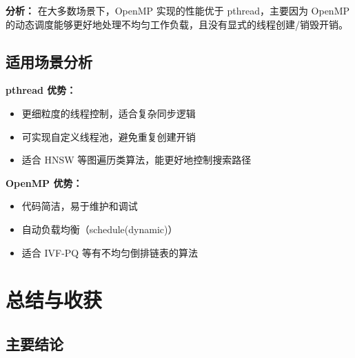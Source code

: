 \documentclass[a4paper]{article}
\begin{document}
\textbf{分析：} 在大多数场景下，OpenMP 实现的性能优于 pthread，主要因为 OpenMP 的动态调度能够更好地处理不均匀工作负载，且没有显式的线程创建/销毁开销。

\subsection{适用场景分析}

\textbf{pthread 优势：}
\begin{itemize}
\item 更细粒度的线程控制，适合复杂同步逻辑
\item 可实现自定义线程池，避免重复创建开销
\item 适合 HNSW 等图遍历类算法，能更好地控制搜索路径
\end{itemize}

\textbf{OpenMP 优势：}
\begin{itemize}
\item 代码简洁，易于维护和调试
\item 自动负载均衡（schedule(dynamic)）
\item 适合 IVF-PQ 等有不均匀倒排链表的算法
\end{itemize}

\section{总结与收获}

\subsection{主要结论}
\end{document}
